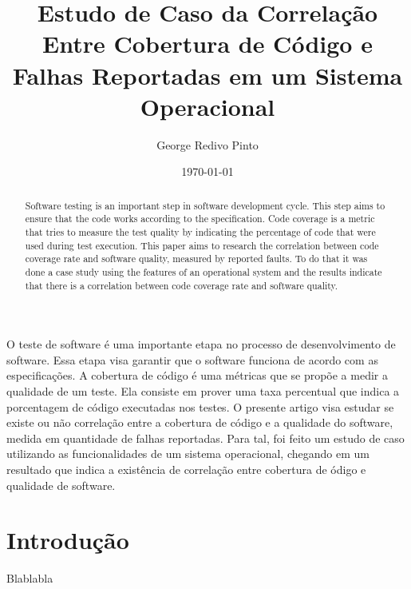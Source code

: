 \documentclass[11.5pt]{article}
\date{\today}
\title{
    Estudo de Caso da Correlação Entre Cobertura de Código e Falhas Reportadas em um Sistema
    Operacional
}
\author{George Redivo Pinto}
\begin{document}
\imprimircapa
\imprimirfolhaderosto

\maketitle

\begin{abstract}

Software testing is an important step in software development cycle. This step aims to ensure that
the code works according to the specification.
Code coverage is a metric that tries to measure the test quality by indicating the percentage of
code that were used during test execution.
This paper aims to research the correlation between code coverage rate and software quality,
measured by reported faults.
To do that it was done a case study using the features of an operational system and the results
indicate that there is a correlation between code coverage rate and software quality.

\end{abstract}

\begin{resumo}

O teste de software é uma importante etapa no processo de desenvolvimento de software. Essa etapa
visa garantir que o software funciona de acordo com as especificações.
A cobertura de código é uma métricas que se propõe a medir a qualidade de um teste. Ela consiste em
prover uma taxa percentual que indica a porcentagem de código executadas nos testes.
O presente artigo visa estudar se existe ou não correlação entre a cobertura de código e a
qualidade do software, medida em quantidade de falhas reportadas.
Para tal, foi feito um estudo de caso utilizando as funcionalidades de um sistema operacional,
chegando em um resultado que indica a existência de correlação entre cobertura de ódigo e
qualidade de software.


\end{resumo}




\section{Introdução}
Blablabla
\end{document}
